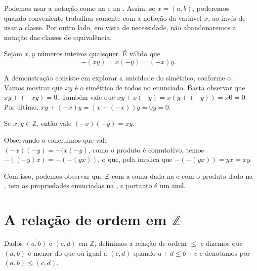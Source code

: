\documentclass[../main.tex]{subfiles}
\begin{document}
Podemos usar a notação como na  e na . Assim, se $x = \overline{(a,b)}$, poderemos quando conveniente trabalhar somente com a notação da variável $x$, ao invés de usar a classe. Por outro lado, em vista de necessidade, não abandonaremos a notação das classes de equivalência.

\begin{teo}\label{int-teo-produtoRegraSinal1}
    Sejam $x, y$ números inteiros quaisquer. É válido que 
    \[ -(xy) = x(-y) = (-x)y. \]
\end{teo}
\begin{dem}
    A demonstração consiste em explorar a unicidade do simétrico, conforme o .
    Vamos mostrar que $xy$ é o simétrico de todos no enunciado. Basta observar que $xy + (-xy) = 0$.
    Também vale que $xy + x(-y) = x(y+(-y)) = x0 = 0$. Por último, $xy + (-x)y = (x + (-x))y = 0y = 0$.
\end{dem}
\begin{corol}\label{int-corol-produtoRegraSinal2}
    Se $x,y \in \mathbb{Z}$, então vale $(-x)(-y) = xy$.
\end{corol}
\begin{dem}
    Observando o  concluímos que vale \\ $(-x)(-y) = -(x(-y)$, como o produto é comutativo, temos $-((-y)x) = -(-(yx))$,
    o que, pela  implica que $-(-(yx)) = yx = xy$.
\end{dem}

Com isso, podemos observar que $\mathbb{Z}$ com a soma dada na  e com o produto dado na , tem as propriedades enunciadas na , e portanto é um anel.

\section{A relação de ordem em $\mathbb{Z}$}
\begin{defi}\label{int-def-relacaoOrdem}
    Dados $\overline{(a,b)}$ e $\overline{(c,d)}$ em $\mathbb{Z}$, definimos a relação de ordem $\leq$ e dizemos que $\overline{(a,b)}$ é menor do que ou igual a $\overline{(c,d)}$ quando $a+d \leq b+c$ e denotamos por $\overline{(a,b)} \leq \overline{(c,d)}$.
\end{defi}
\end{document}

